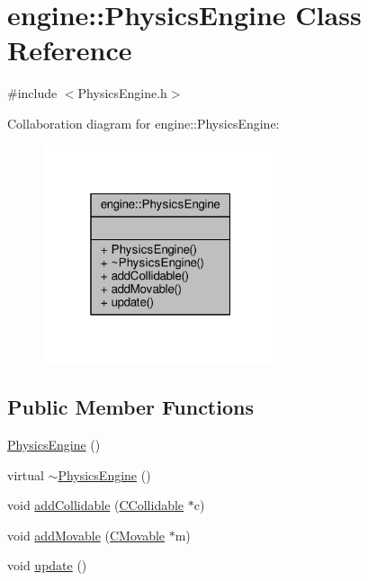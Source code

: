 \hypertarget{classengine_1_1PhysicsEngine}{\section{engine\-:\-:Physics\-Engine Class Reference}
\label{classengine_1_1PhysicsEngine}
}


{\ttfamily \#include $<$Physics\-Engine.\-h$>$}



Collaboration diagram for engine\-:\-:Physics\-Engine\-:
\nopagebreak
\begin{figure}[H]
\begin{center}
\leavevmode
\includegraphics[width=196pt]{classengine_1_1PhysicsEngine__coll__graph}
\end{center}
\end{figure}
\subsection*{Public Member Functions}
\begin{DoxyCompactItemize}
\item 
\hyperlink{classengine_1_1PhysicsEngine_a14c98b9b2eae12bff267b99df27ac9fc}{Physics\-Engine} ()
\item 
virtual \hyperlink{classengine_1_1PhysicsEngine_a7b708ba5517fdd9cc95c977dde7ff4ab}{$\sim$\-Physics\-Engine} ()
\item 
void \hyperlink{classengine_1_1PhysicsEngine_a609b1b5b818d7865c9b20abfe07e26e8}{add\-Collidable} (\hyperlink{classengine_1_1CCollidable}{C\-Collidable} $\ast$c)
\item 
void \hyperlink{classengine_1_1PhysicsEngine_a32690f48a5df0b98c5f326c0b11414ba}{add\-Movable} (\hyperlink{classengine_1_1CMovable}{C\-Movable} $\ast$m)
\item 
void \hyperlink{classengine_1_1PhysicsEngine_a468ef9599ccd80e7e5c170d741ab1d21}{update} ()
\end{DoxyCompactItemize}


